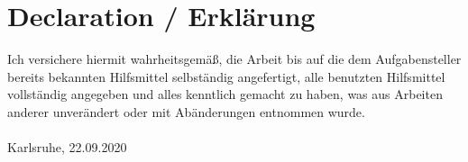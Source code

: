 
\chapter*{Declaration / Erkl\"arung}
Ich versichere hiermit wahrheitsgemäß, die Arbeit bis auf die dem Aufgabensteller bereits bekannten Hilfsmittel selbständig angefertigt,
alle benutzten Hilfsmittel vollständig angegeben und alles kenntlich gemacht zu haben, was aus Arbeiten anderer unverändert oder mit Abänderungen entnommen wurde.\\

\vspace{2cm}
\myname \\
Karlsruhe, 22.09.2020\\

